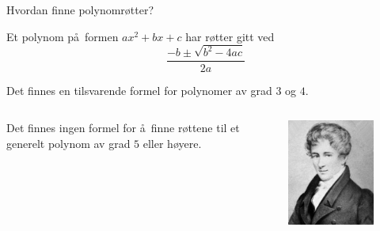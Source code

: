 \documentclass[norsk, handout]{beamer}
\theoremstyle{example}
\begin{document}
\begin{frame}{Hvordan finne polynomrøtter?}
    \begin{lemma}
        Et polynom på formen $ax^2 + bx + c$
        har røtter gitt ved
        \[
            \frac {
                -b \pm \sqrt{b^2 - 4ac}
            }{2a}
        \]
    \end{lemma}
    \pause
    \begin{fact}
        Det finnes en tilsvarende formel for polynomer av grad $3$ og $4$.
    \end{fact}
    \pause
    \begin{columns}
        \begin{column}{.6\textwidth}
            \begin{theorem}
                Det finnes ingen formel for å finne røttene til et
                generelt polynom av grad $5$ eller høyere.
            \end{theorem}
        \end{column}
        \begin{column}{.25\textwidth}
            \begin{figure}
                \centering
                \includegraphics[width=\textwidth]{figures/abel-portrait.jpg}
            \end{figure}
        \end{column}
    \end{columns}
\end{frame}
\end{document}
